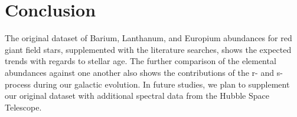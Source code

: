 \section{Conclusion}

The original dataset of Barium, Lanthanum, and Europium abundances for red giant field stars, supplemented with the literature searches, shows the expected trends with regards to stellar age. The further comparison of the elemental abundances against one another also shows the contributions of the r- and s- process during our galactic evolution. In future studies, we plan to supplement our original dataset with additional spectral data from the Hubble Space Telescope.
